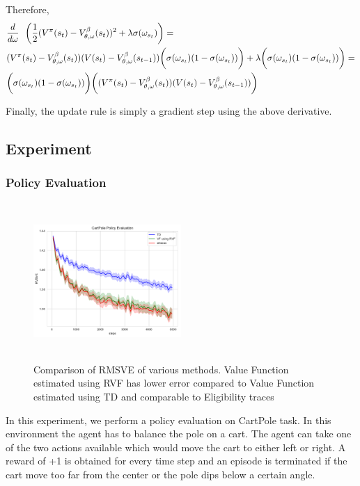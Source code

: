 Therefore, 
\begin{align}
    &\frac{d}{d\omega} \ \ \bigg( \frac{1}{2}(V^{\pi}(s_t) - V^{\beta}_{\theta,\omega}(s_t))^2 + \lambda \sigma(\omega_{s_t}) \bigg) =\\
    &(V^{\pi}(s_t) - V^{\beta}_{\theta,\omega}(s_t)) (V(s_t) - V^{\beta}_{\theta,\omega}(s_{t-1}))\bigg(\sigma(\omega_{s_t})(1 - \sigma(\omega_{s_t}))\bigg)
     + \lambda \bigg(\sigma(\omega_{s_t})(1 - \sigma(\omega_{s_t}))\bigg)  = \\
     &\bigg(\sigma(\omega_{s_t})(1 - \sigma(\omega_{s_t}))\bigg) \bigg((V^{\pi}(s_t) - V^{\beta}_{\theta,\omega}(s_t))(V(s_t) - V^{\beta}_{\theta,\omega}(s_{t-1})) \bigg)
\end{align}

Finally, the update rule is simply a gradient step using the above derivative.
\subsection{Experiment}
\subsubsection{Policy Evaluation}
\label{Policy_evaluation_RVF}
\begin{figure}[h]
    \centering
    \includegraphics[width=0.5\textwidth, height=6cm]{fig/policy_evaluation.pdf}
    \caption{Comparison of RMSVE of various methods. Value Function estimated using RVF has lower error compared to Value Function estimated using TD and comparable to Eligibility traces}
    \label{fig:policy_eval}
\end{figure}
In this experiment, we perform a policy evaluation on CartPole task. In this environment the agent has to balance the pole on a cart. The agent can take one of the two actions available which would move the cart to either left or right. A reward of +1 is obtained for every time step and an episode is terminated if the cart move too far from the center or the pole dips below a certain angle.

